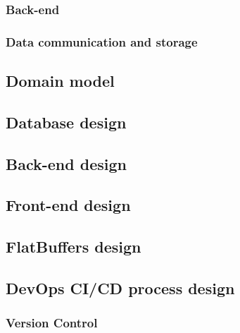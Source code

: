 \documentclass{article}
\begin{document}
        \subsubsection{Back-end}
        

        \subsubsection{Data communication and storage}
        

    \subsection{Domain model}
    

    \subsection{Database design}

    \subsection{Back-end design}

    \subsection{Front-end design}

    \subsection{FlatBuffers design}

    \subsection{DevOps CI/CD process design} %

        \subsubsection{Version Control}
\end{document}
